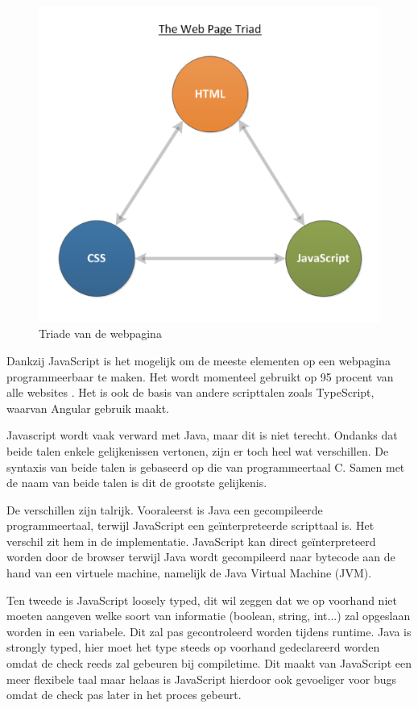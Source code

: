 \begin{figure}[H]
	\centering
	\includegraphics[width=0.6\linewidth]{triadJavaScript}
	\caption{Triade van de webpagina \autocite{itegrators2017}}
	\label{fig:Triade}
\end{figure}

Dankzij JavaScript is het mogelijk om de meeste elementen op een webpagina programmeerbaar te maken. Het wordt momenteel gebruikt op 95 procent van alle websites \autocite{W3Techs2019}. Het is ook de basis van andere scripttalen zoals TypeScript, waarvan Angular gebruik maakt.

Javascript wordt vaak verward met Java, maar dit is niet terecht. Ondanks dat beide talen enkele gelijkenissen vertonen, zijn er toch heel wat verschillen. De syntaxis van beide talen is gebaseerd op die van programmeertaal C. Samen met de naam van beide talen is dit de grootste gelijkenis. 

De verschillen zijn talrijk.
 Vooraleerst is Java een gecompileerde programmeertaal, terwijl JavaScript een geïnterpreteerde scripttaal is. Het verschil zit hem in de implementatie.  JavaScript kan direct geïnterpreteerd worden door de browser terwijl Java wordt gecompileerd naar bytecode aan de hand van een virtuele machine, namelijk de Java Virtual Machine (JVM). 

 Ten tweede is JavaScript loosely typed, dit wil zeggen dat we op voorhand niet moeten aangeven welke soort van informatie (boolean, string, int...) zal opgeslaan worden in een variabele. Dit zal pas gecontroleerd worden tijdens runtime. Java is strongly typed, hier moet het type steeds op voorhand gedeclareerd worden omdat de check reeds zal gebeuren bij compiletime. Dit maakt van JavaScript een meer flexibele taal maar helaas is JavaScript hierdoor ook gevoeliger voor bugs omdat de check pas later in het proces gebeurt.
 
